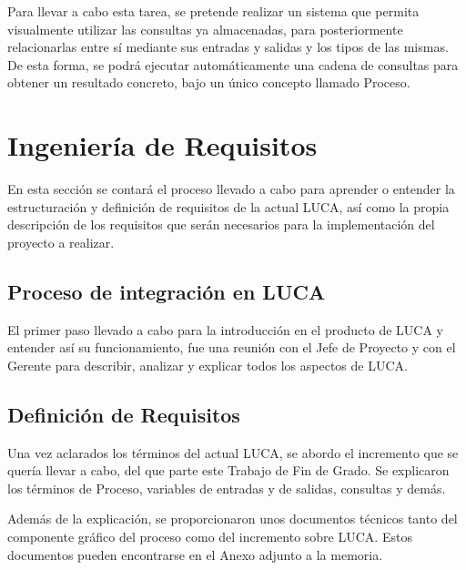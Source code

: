 \vspace{5mm}

Para llevar a cabo esta tarea, se pretende realizar un sistema que permita visualmente utilizar las consultas ya almacenadas, para posteriormente relacionarlas entre sí mediante sus entradas y salidas y los tipos de las mismas. De esta forma, se podrá ejecutar automáticamente una cadena de consultas para obtener un resultado concreto, bajo un único concepto llamado Proceso.


\section{Ingeniería de Requisitos}

En esta sección se contará el proceso llevado a cabo para aprender o entender la estructuración y definición de requisitos de la actual LUCA, así como la propia descripción de los requisitos que serán necesarios para la implementación del proyecto a realizar.

\subsection{Proceso de integración en LUCA}

El primer paso llevado a cabo para la introducción en el producto de LUCA y entender así su funcionamiento, fue una reunión con el Jefe de Proyecto y con el Gerente para describir, analizar y explicar todos los aspectos de LUCA.

\subsection{Definición de Requisitos}

Una vez aclarados los términos del actual LUCA, se abordo el incremento que se quería llevar a cabo, del que parte este Trabajo de Fin de Grado. Se explicaron los términos de Proceso, variables de entradas y de salidas, consultas y demás.

\vspace{5mm}

Además de la explicación, se proporcionaron unos documentos técnicos tanto del componente gráfico del proceso como del incremento sobre LUCA. Estos documentos pueden encontrarse en el Anexo adjunto a la memoria.

